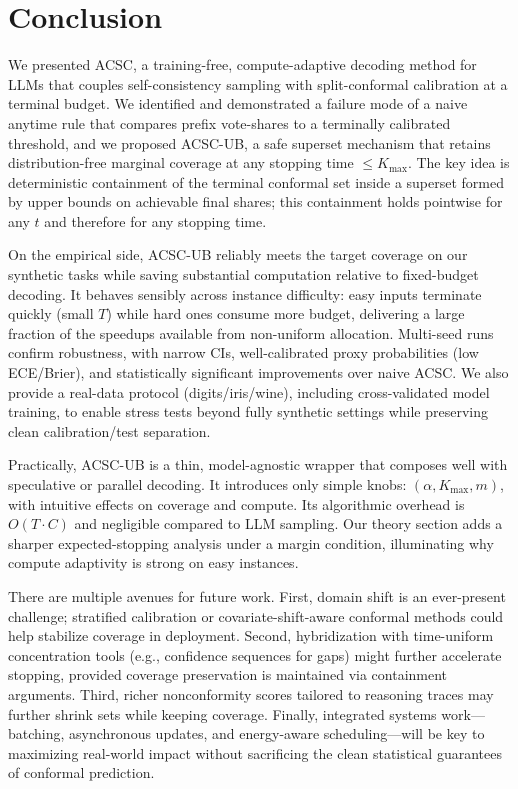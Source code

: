 \documentclass[11pt]{article}
\begin{document}
\section{Conclusion}
We presented ACSC, a training-free, compute-adaptive decoding method for LLMs that couples self-consistency sampling with split-conformal calibration at a terminal budget. We identified and demonstrated a failure mode of a naive anytime rule that compares prefix vote-shares to a terminally calibrated threshold, and we proposed ACSC-UB, a safe superset mechanism that retains distribution-free marginal coverage at any stopping time $\le K_{\max}$. The key idea is deterministic containment of the terminal conformal set inside a superset formed by upper bounds on achievable final shares; this containment holds pointwise for any $t$ and therefore for any stopping time.

On the empirical side, ACSC-UB reliably meets the target coverage on our synthetic tasks while saving substantial computation relative to fixed-budget decoding. It behaves sensibly across instance difficulty: easy inputs terminate quickly (small $T$) while hard ones consume more budget, delivering a large fraction of the speedups available from non-uniform allocation. Multi-seed runs confirm robustness, with narrow CIs, well-calibrated proxy probabilities (low ECE/Brier), and statistically significant improvements over naive ACSC. We also provide a real-data protocol (digits/iris/wine), including cross-validated model training, to enable stress tests beyond fully synthetic settings while preserving clean calibration/test separation.

Practically, ACSC-UB is a thin, model-agnostic wrapper that composes well with speculative or parallel decoding. It introduces only simple knobs: $(\alpha, K_{\max}, m)$, with intuitive effects on coverage and compute. Its algorithmic overhead is $O(T\cdot C)$ and negligible compared to LLM sampling. Our theory section adds a sharper expected-stopping analysis under a margin condition, illuminating why compute adaptivity is strong on easy instances.

There are multiple avenues for future work. First, domain shift is an ever-present challenge; stratified calibration or covariate-shift-aware conformal methods could help stabilize coverage in deployment. Second, hybridization with time-uniform concentration tools (e.g., confidence sequences for gaps) might further accelerate stopping, provided coverage preservation is maintained via containment arguments. Third, richer nonconformity scores tailored to reasoning traces may further shrink sets while keeping coverage. Finally, integrated systems work—batching, asynchronous updates, and energy-aware scheduling—will be key to maximizing real-world impact without sacrificing the clean statistical guarantees of conformal prediction.
\end{document}
